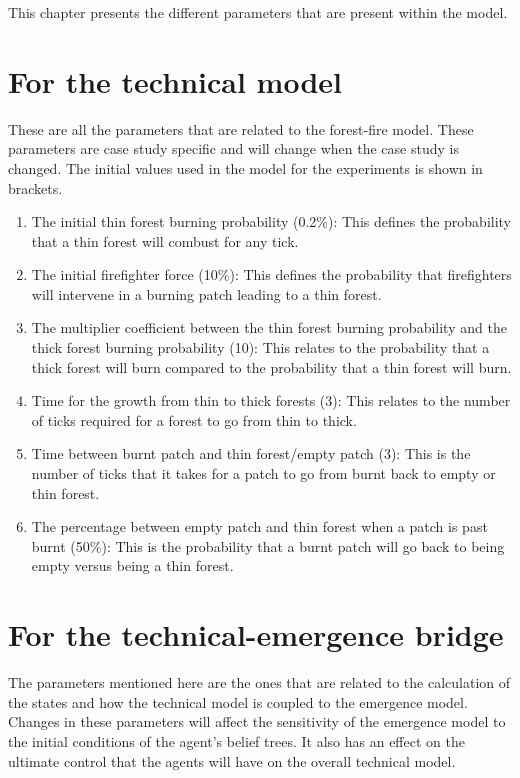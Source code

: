 This chapter presents the different parameters that are present within the model.

\section{For the technical model}

These are all the parameters that are related to the forest-fire model. These parameters are case study specific and will change when the case study is changed. The initial values used in the model for the experiments is shown in brackets.

\begin{enumerate}
\item The initial thin forest burning probability (0.2\%): This defines the probability that a thin forest will combust for any tick.
\item The initial firefighter force (10\%): This defines the probability that firefighters will intervene in a burning patch leading to a thin forest.
\item The multiplier coefficient between the thin forest burning probability and the thick forest burning probability (10): This relates to the probability that a thick forest will burn compared to the probability that a thin forest will burn.
\item Time for the growth from thin to thick forests (3): This relates to the number of ticks required for a forest to go from thin to thick.
\item Time between burnt patch and thin forest/empty patch (3): This is the number of ticks that it takes for a patch to go from burnt back to empty or thin forest.
\item The percentage between empty patch and thin forest when a patch is past burnt (50\%): This is the probability that a burnt patch will go back to being empty versus being a thin forest.
\end{enumerate}

\section{For the technical-emergence bridge}

The parameters mentioned here are the ones that are related to the calculation of the states and how the technical model is coupled to the emergence model. Changes in these parameters will affect the sensitivity of the emergence model to the initial conditions of the agent's belief trees. It also has an effect on the ultimate control that the agents will have on the overall technical model.

